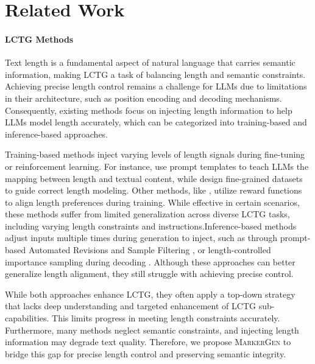 

\clearpage
\section{Related Work}
\label{sec:related work}


\paragraph{LCTG Methods}
Text length is a fundamental aspect of natural language that carries semantic information, making LCTG a task of balancing length and semantic constraints. Achieving precise length control remains a challenge for LLMs due to limitations in their architecture, such as position encoding \citep{butcher2024precise,kazemnejad2024impact,chang2024language} and decoding mechanisms\citep{huang2025decoding}. Consequently, existing methods focus on injecting length information to help LLMs model length accurately, which can be categorized into training-based and inference-based approaches.

Training-based methods inject varying levels of length signals during fine-tuning or reinforcement learning. For instance, \citet{promptRein, ruler} use prompt templates to teach LLMs the mapping between length and textual content, while \citet{song2024hansel, wang2024positionid} design fine-grained datasets to guide correct length modeling. Other methods, like \citet{lift, promptRein}, utilize reward functions to align length preferences during training. While effective in certain scenarios, these methods suffer from limited generalization across diverse LCTG tasks, including varying length constraints and instructions.Inference-based methods adjust inputs multiple times during generation to inject, such as through prompt-based Automated Revisions and Sample Filtering \citep{retkowski2024zero,juseon2024instructcmp}, or length-controlled importance sampling during decoding \citep{gu2024length}. Although these approaches can better generalize length alignment, they still struggle with achieving precise control.

While both approaches enhance LCTG, they often apply a top-down strategy that lacks deep understanding and targeted enhancement of LCTG sub-capabilities. This limits progress in meeting length constraints accurately. Furthermore, many methods neglect semantic constraints, and injecting length information may degrade text quality. Therefore, we propose \textsc{MarkerGen} to bridge this gap for precise length control and preserving semantic integrity.


